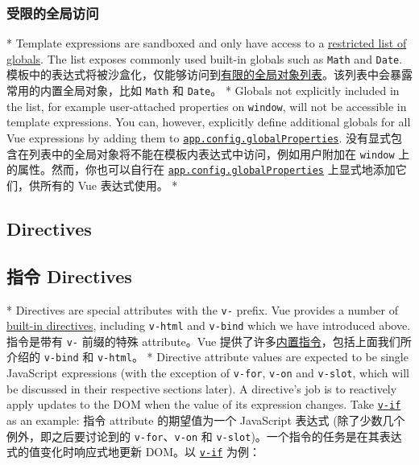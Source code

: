 \begin{paracol}{2}
\subsubsection{受限的全局访问}
\switchcolumn[0]*%
Template expressions are sandboxed and only have access to a
\href{https://github.com/vuejs/core/blob/main/packages/shared/src/globalsAllowList.ts\#L3}{restricted
list of globals}. The list exposes commonly used built-in globals such
as \texttt{Math} and \texttt{Date}.
\switchcolumn
模板中的表达式将被沙盒化，仅能够访问到\href{https://github.com/vuejs/core/blob/main/packages/shared/src/globalsAllowList.ts\#L3}{有限的全局对象列表}。该列表中会暴露常用的内置全局对象，比如
\texttt{Math} 和 \texttt{Date}。
\switchcolumn[0]*%
Globals not explicitly included in the list, for example user-attached
properties on \texttt{window}, will not be accessible in template
expressions. You can, however, explicitly define additional globals for
all Vue expressions by adding them to
\href{https://vuejs.org/api/application.html\#app-config-globalproperties}{\texttt{app.config.globalProperties}}.
\switchcolumn
没有显式包含在列表中的全局对象将不能在模板内表达式中访问，例如用户附加在
\texttt{window} 上的属性。然而，你也可以自行在
\href{https://cn.vuejs.org/api/application.html\#app-config-globalproperties}{\texttt{app.config.globalProperties}}
上显式地添加它们，供所有的 Vue 表达式使用。
\switchcolumn[0]*%
\subsection{Directives}
\switchcolumn
\subsection{指令 Directives}
\switchcolumn[0]*%
Directives are special attributes with the \texttt{v-} prefix. Vue
provides a number of
\href{https://vuejs.org/api/built-in-directives.html}{built-in
directives}, including \texttt{v-html} and \texttt{v-bind} which we have
introduced above.
\switchcolumn
指令是带有 \texttt{v-} 前缀的特殊 attribute。Vue
提供了许多\href{https://cn.vuejs.org/api/built-in-directives.html}{内置指令}，包括上面我们所介绍的
\texttt{v-bind} 和 \texttt{v-html}。
\switchcolumn[0]*%
Directive attribute values are expected to be single JavaScript
expressions (with the exception of \texttt{v-for}, \texttt{v-on} and
\texttt{v-slot}, which will be discussed in their respective sections
later). A directive's job is to reactively apply updates to the DOM when
the value of its expression changes. Take
\href{https://vuejs.org/api/built-in-directives.html\#v-if}{\texttt{v-if}}
as an example:
\switchcolumn
指令 attribute 的期望值为一个 JavaScript 表达式
(除了少数几个例外，即之后要讨论到的 \texttt{v-for}、\texttt{v-on} 和
\texttt{v-slot})。一个指令的任务是在其表达式的值变化时响应式地更新
DOM。以
\href{https://cn.vuejs.org/api/built-in-directives.html\#v-if}{\texttt{v-if}}
为例：
\end{paracol}


\begin{vueQuote}
\end{vueQuote}